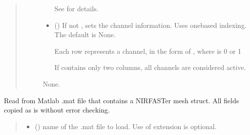 \documentclass[letterpaper,10pt,english]{sphinxmanual}
\begin{document}
\begin{fulllineitems}
\begin{fulllineitems}
\begin{quote}
\begin{description}
\begin{itemize}
\sphinxAtStartPar
See {\hyperref[\detokenize{_autosummary/nirfasterff.base.optodes.optode:nirfasterff.base.optodes.optode.touch_detectors}]{}} for details.


\item {} 
\sphinxAtStartPar
{} (\sphinxstyleliteralemphasis{\sphinxupquote{, }}) \textendash{} 
\sphinxAtStartPar
If not , sets the channel information. Uses one\sphinxhyphen{}based indexing. The default is None.

\sphinxAtStartPar
Each row represents a channel, in the form of , where  is 0 or 1

\sphinxAtStartPar
If  contains only two columns, all channels are considered active.


\end{itemize}

\sphinxAtStartPar
None.

\end{description}\end{quote}

\end{fulllineitems}


\begin{fulllineitems}
\label{\detokenize{_autosummary/nirfasterff.base.dcs_mesh.dcsmesh:nirfasterff.base.dcs_mesh.dcsmesh.from_mat}}
\pysigstartsignatures
{}
\pysigstopsignatures
\sphinxAtStartPar
Read from Matlab .mat file that contains a NIRFASTer mesh struct. All fields copied as is without error checking.
\begin{quote}\begin{description}
\begin{itemize}
\item {} 
\sphinxAtStartPar
{} () \textendash{} name of the .mat file to load. Use of extension is optional.


\end{itemize}
\end{description}
\end{quote}
\end{fulllineitems}
\end{fulllineitems}
\end{document}
